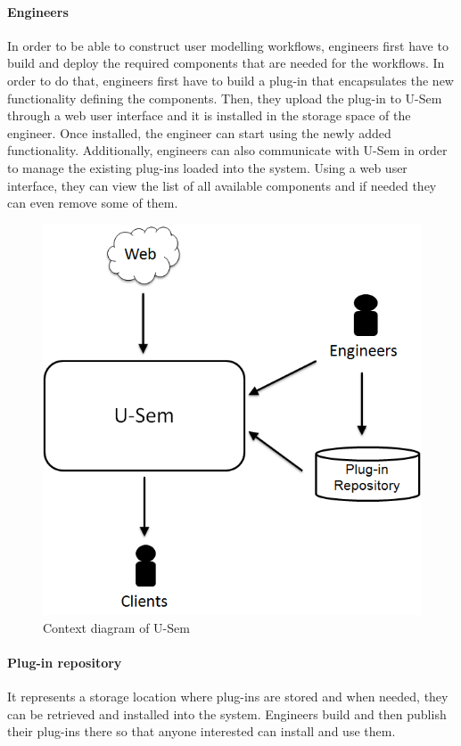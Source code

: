 \paragraph{Engineers}
In order to be able to construct user modelling workflows, engineers first have to build and deploy the required components that are needed for the workflows. In order to do that, engineers first have to build a plug-in that encapsulates the new functionality defining the components. Then, they upload the plug-in to U-Sem through a web user interface and it is installed in the storage space of the engineer. Once installed, the engineer can start using the newly added functionality. Additionally, engineers can also communicate with U-Sem in order to manage the existing plug-ins loaded into the system. Using a web user interface, they can view the list of all available components and if needed they can even remove some of them.

\begin{figure}[h!]
  \centering
  	\includegraphics[scale=0.5]{plug-in/environment/runtime_env.png}
  \caption{Context diagram of U-Sem }
  \label{fig_context}
\end{figure}

\paragraph{Plug-in repository}
It represents a storage location where plug-ins are stored and when needed, they can be retrieved and installed into the system. Engineers build and then publish their plug-ins there so that anyone interested can install and use them. 


